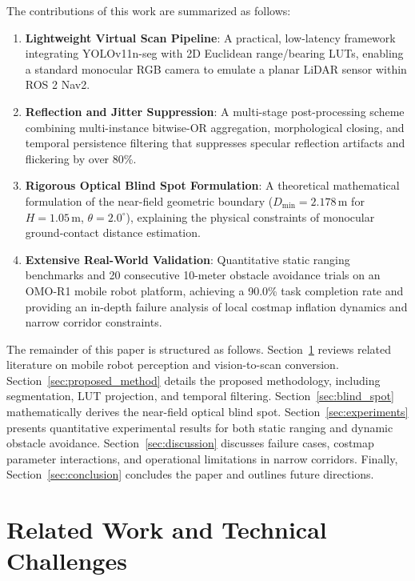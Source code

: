 \documentclass[preprint,12pt]{elsarticle}
\begin{document}
The contributions of this work are summarized as follows:
\begin{enumerate}
  \item \textbf{Lightweight Virtual Scan Pipeline}: A practical, low-latency framework integrating YOLOv11n-seg with 2D Euclidean range/bearing LUTs, enabling a standard monocular RGB camera to emulate a planar LiDAR sensor within ROS 2 Nav2.
  \item \textbf{Reflection and Jitter Suppression}: A multi-stage post-processing scheme combining multi-instance bitwise-OR aggregation, morphological closing, and temporal persistence filtering that suppresses specular reflection artifacts and flickering by over 80\%.
  \item \textbf{Rigorous Optical Blind Spot Formulation}: A theoretical mathematical formulation of the near-field geometric boundary ($D_{\min} = 2.178$\,m for $H = 1.05$\,m, $\theta = 2.0^\circ$), explaining the physical constraints of monocular ground-contact distance estimation.
  \item \textbf{Extensive Real-World Validation}: Quantitative static ranging benchmarks and 20 consecutive 10-meter obstacle avoidance trials on an OMO-R1 mobile robot platform, achieving a 90.0\% task completion rate and providing an in-depth failure analysis of local costmap inflation dynamics and narrow corridor constraints.
\end{enumerate}

The remainder of this paper is structured as follows. Section~\ref{sec:related_work} reviews related literature on mobile robot perception and vision-to-scan conversion. Section~\ref{sec:proposed_method} details the proposed methodology, including segmentation, LUT projection, and temporal filtering. Section~\ref{sec:blind_spot} mathematically derives the near-field optical blind spot. Section~\ref{sec:experiments} presents quantitative experimental results for both static ranging and dynamic obstacle avoidance. Section~\ref{sec:discussion} discusses failure cases, costmap parameter interactions, and operational limitations in narrow corridors. Finally, Section~\ref{sec:conclusion} concludes the paper and outlines future directions.

\section{Related Work and Technical Challenges}
\label{sec:related_work}
\end{document}
